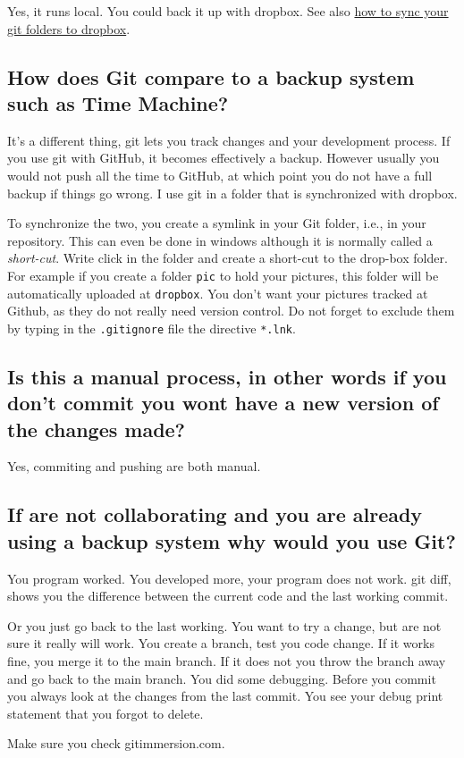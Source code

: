  Yes, it runs local. You could back it up with dropbox. See also \href{http://dotmonster.co/backup-and-sync-folders-with-dropbox-and-symbolic-links/}{how to sync your git folders to dropbox}.

\subsection*{How does Git compare to a backup system such as Time Machine?}

It's a different thing, git lets you track changes and your development process. If you use git with GitHub, it becomes effectively a backup. However usually you would not push all the time to GitHub, at which point you do not have a full backup if things go wrong. I use git in a folder that is synchronized with dropbox.

 To synchronize the two, you create a symlink in your Git folder, i.e., in your repository. This can even be done in windows although it is normally called a \textit{short-cut}. Write click in the folder and create a short-cut to the drop-box folder. For example if you create a folder \texttt{pic} to hold your pictures, this folder will be automatically uploaded at \texttt{dropbox}. You don't want your pictures tracked at Github, as they do not really need version control. Do not forget to exclude them by typing in the \texttt{.gitignore} file the directive  \verb|*.lnk|.

\subsection*{Is this a manual process, in other words if you don't commit you wont have a new version of the changes made?}

Yes, commiting and pushing are both manual.

\subsection*{If are not collaborating and you are already using a backup system why would you use Git?}

 You program worked. You developed more, your program does not work. git diff, shows you the difference between the current code and the last working commit.

 Or you just go back to the last working. You want to try a change, but are not sure it really will work. 
 You create a branch, test you code change. If it works fine, you merge it to the main branch. If it does not you throw the branch away and go back to the main branch.
 You did some debugging. Before you commit you always look at the changes from the last commit. You see your debug print statement that you forgot to delete.

Make sure you check gitimmersion.com.















